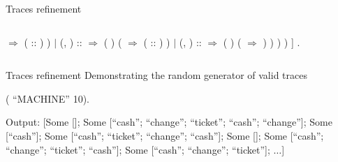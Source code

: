 \documentclass[t]{beamer}
\begin{document}
\begin{frame}{Traces refinement}
\begin{columns}
		\begin{coqdoccode}
			\scriptsize
			  \ensuremath{\Rightarrow}  (  :: )\coqdoceol
			\coqdocindent{7.00em}
			)\coqdoceol
			\coqdocindent{6.00em}
			\ensuremath{|} (, ) :: \coqdocvar{\_} \ensuremath{\Rightarrow}\coqdoceol
			\coqdocindent{7.00em}
			 (  \coqdoceol\coqdocindent{7.50em} ) (\coqdoceol
			\coqdocindent{8.00em}
			  \ensuremath{\Rightarrow}  ( :: )\coqdoceol
			\coqdocindent{7.00em}
			)\coqdoceol
			\coqdocindent{6.00em}
			\ensuremath{|} (, ) :: \coqdocvar{\_} \ensuremath{\Rightarrow}\coqdoceol
			\coqdocindent{7.00em}
			 (  \coqdoceol\coqdocindent{7.50em} ) (\coqdoceol
			\coqdocindent{8.00em}
			  \ensuremath{\Rightarrow}  \coqdoceol
			\coqdocindent{7.00em}
			)\coqdoceol
			\coqdocindent{6.00em}
			\coqdoceol
			\coqdocindent{5.00em}
			)\coqdoceol
			\coqdocindent{4.00em}
			)\coqdoceol
			\coqdocindent{3.00em}
			)\coqdoceol
			\coqdocindent{2.00em}
			]\coqdoceol
			\coqdocindent{1.00em}
			.\coqdoceol
		\end{coqdoccode}
	\end{columns}
\end{frame}

\begin{frame}{Traces refinement}
	Demonstrating the random generator of valid traces
	\vskip 0.1in
	\small
	\begin{coqdoccode}
		\coqdocnoindent
		 (  ``MACHINE'' 10).\coqdoceol
	\end{coqdoccode}
	\vskip 0.2in
	Output:
	\vskip 0.1in
	\ttfamily
	{[Some []; Some [``cash''; ``change''; ``ticket''; ``cash''; ``change'']};
	{Some [``cash'']; Some [``cash''; ``ticket''; ``change''; ``cash'']; Some []};
	{Some [``cash''; ``change''; ``ticket''; ``cash'']; Some [``cash''; ``change''; ``ticket'']; $\dots$]}
\end{frame}
\end{document}
